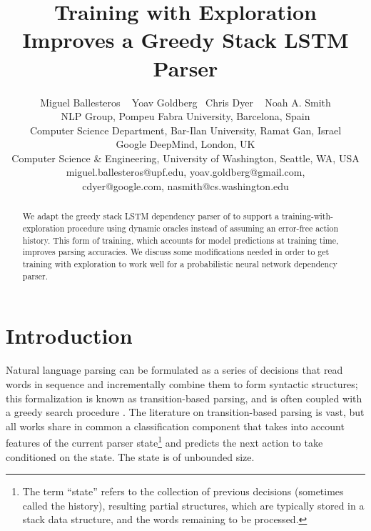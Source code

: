 \documentclass[11pt]{article}
\begin{document}
\title{Training with Exploration Improves a Greedy Stack LSTM Parser}
\author{Miguel Ballesteros ~ Yoav Goldberg~ Chris Dyer ~ Noah A. Smith\\
NLP Group, Pompeu Fabra University, Barcelona, Spain \\
Computer Science Department, Bar-Ilan University, Ramat Gan, Israel \\
Google DeepMind, London, UK \\
Computer Science \& Engineering, University of Washington, Seattle, WA, USA\\
{ \sf miguel.ballesteros@upf.edu, yoav.goldberg@gmail.com, } \\
{\sf  cdyer@google.com, nasmith@cs.washington.edu}
}


\maketitle              


\begin{abstract}
    We adapt the greedy stack LSTM dependency parser of  to support a
    training-with-exploration procedure using dynamic oracles
    \cite{goldberg2013training} instead of assuming an error-free
    action history. This form of training, which accounts for model predictions at training time, improves
    parsing accuracies.  We discuss some modifications needed in order
    to get training with exploration to work well for a probabilistic
    neural network
    dependency parser.
\end{abstract}

\section{Introduction}

Natural language parsing can be formulated as a series of decisions that read
words in sequence and incrementally combine them to form syntactic structures;
this formalization is known as transition-based parsing, and is often coupled
with a greedy search procedure
\cite{yamada03,nivre03iwpt,nivre2004,nivre08cl}. 
The literature on transition-based parsing is vast, but all works share in
common a classification component that takes into account features of the current
parser state\footnote{The term ``state''
 refers to the collection of previous decisions (sometimes called the history),
 resulting partial structures, which are typically stored in a stack data structure,
 and the words remaining to be processed.} and predicts the next action to
 take conditioned on the state. The state is of unbounded size.
\end{document}

